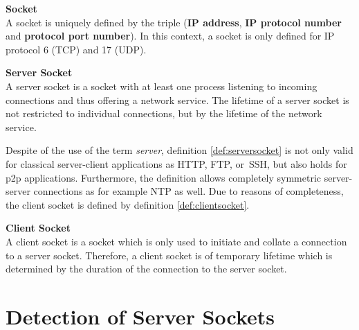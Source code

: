 \parbox{
\textwidth}{
\begin{defn}
	{\textbf{Socket}\\} A socket is uniquely defined by the triple (\textbf{IP address}, \textbf{IP protocol number} and \textbf{protocol port number}). In this context, a socket is only defined for IP protocol 6 (\gls{TCP}) and 17 (\gls{UDP}).
\end{defn}
}
\parbox{
\textwidth}{
\begin{defn}
	{\textbf{Server Socket
	\label{def:serversocket}}\\} A server socket is a socket with at least one process listening to incoming connections and thus offering a network service. The lifetime of a server socket is not restricted to individual connections, but by the lifetime of the network service.
\end{defn}
}

Despite of the use of the term \emph{server}, definition \ref{def:serversocket} is not only valid for classical server-client applications as \gls{HTTP}, \gls{FTP}, or \gls{SSH}, but also holds for \gls{p2p} applications. Furthermore, the definition allows completely symmetric server-server connections as for example \gls{NTP} as well. Due to reasons of completeness, the client socket is defined by definition \ref{def:clientsocket}. 

\parbox{
\textwidth}{
\begin{defn}
	{\textbf{Client Socket}\label{def:clientsocket}\\} A client socket is a socket which is only used to initiate and collate a connection to a server socket. Therefore, a client	socket is of temporary lifetime which is determined by the duration of the 	connection to the server socket.
\end{defn}
}


\section{Detection of Server Sockets
\label{section:socket_detection}}

